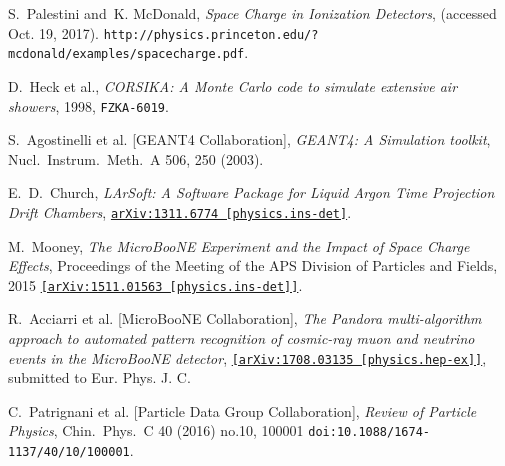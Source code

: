 \documentclass[a4paper,11pt]{article}
\begin{document}
\begin{thebibliography}{99}
   S.~Palestini and~K. McDonald, \textit{Space Charge in Ionization Detectors}, (accessed Oct. 19, 2017). \texttt{http://physics.princeton.edu/?mcdonald/examples/spacecharge.pdf}.

   D.~Heck et al.,
  \textit{CORSIKA: A Monte Carlo code to simulate extensive air showers}, 1998,
  \texttt{FZKA-6019}.

   S.~Agostinelli et al. [GEANT4 Collaboration], \textit{GEANT4: A Simulation toolkit}, Nucl.\ Instrum.\ Meth.\ A {506}, 250 (2003).

  E.~D.~Church, \textit{LArSoft: A Software Package for Liquid Argon Time Projection Drift Chambers},
  \texttt{\href{https://arxiv.org/abs/1311.6774}{arXiv:1311.6774 [physics.ins-det]}}.


   M.~Mooney, \textit{The MicroBooNE Experiment and the Impact of Space Charge Effects}, Proceedings of the Meeting of the APS Division of Particles and Fields, 2015 \texttt{\href{https://arxiv.org/abs/1511.01563}{[arXiv:1511.01563 [physics.ins-det]]}}.



   R.~Acciarri et al. [MicroBooNE Collaboration], \textit{The Pandora multi-algorithm approach to automated pattern recognition of cosmic-ray muon and neutrino events in the MicroBooNE detector}, \texttt{\href{https://arxiv.org/abs/1708.03135}{[arXiv:1708.03135 [physics.hep-ex]]}}, submitted to Eur. Phys. J. C.

   C.~Patrignani et al. [Particle Data Group Collaboration], \textit{Review of Particle Physics}, Chin.\ Phys.\ C 40 (2016) no.10,  100001 \texttt{doi:10.1088/1674-1137/40/10/100001}.





\end{thebibliography}
\end{document}
